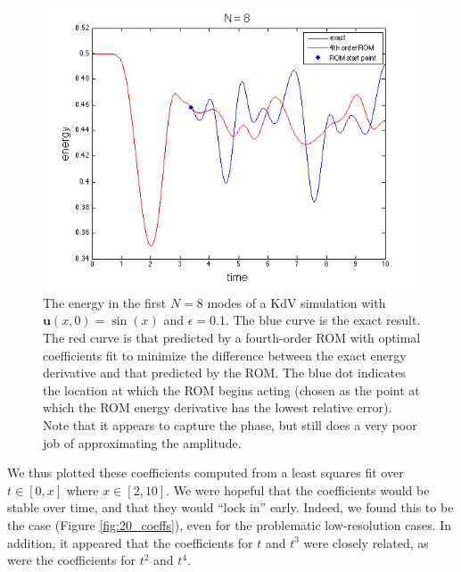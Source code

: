 \documentclass{article}
\begin{document}
\begin{figure}[h]
\includegraphics[width=\textwidth]{4th_order_8.png}
\caption{The energy in the first $N=8$ modes of a KdV simulation with $\mathbf{u}(x,0) = \sin(x)$ and $\epsilon=0.1$. The blue curve is the exact result. The red curve is that predicted by a fourth-order ROM with optimal coefficients fit to minimize the difference between the exact energy derivative and that predicted by the ROM. The blue dot indicates the location at which the ROM begins acting (chosen as the point at which the ROM energy derivative has the lowest relative error). Note that it appears to capture the phase, but still does a very poor job of approximating the amplitude.}\label{fig:8_4th_order}
\end{figure}

We thus plotted these coefficients computed from a least squares fit over $t\in[0,x]$ where $x\in[2,10]$. We were hopeful that the coefficients would be stable over time, and that they would ``lock in'' early. Indeed, we found this to be the case (Figure \ref{fig:20_coeffs}), even for the problematic low-resolution cases. In addition, it appeared that the coefficients for $t$ and $t^3$ were closely related, as were the coefficients for $t^2$ and $t^4$.
\end{document}
